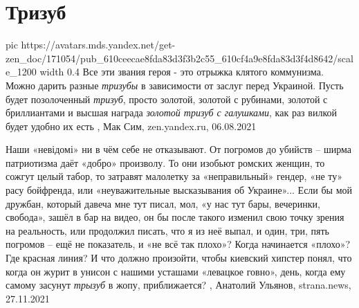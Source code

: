 
 
 
 
 
\chapter{Тризуб}
\label{sec:slova.trizub}

\ifcmt
  pic https://avatars.mds.yandex.net/get-zen_doc/171054/pub_610ceecae8fda83d3f3b2c55_610cf4a9e8fda83d3f4d8642/scale_1200
  width 0.4
\fi
Все эти звания героя - это отрыжка клятого коммунизма. Можно дарить разные
\emph{тризубы} в зависимости от заслуг перед Украиной. Пусть будет позолоченный
\emph{тризуб}, просто золотой, золотой с рубинами, золотой с бриллиантами и высшая
награда \emph{золотой тризуб с галушками}, как раз вилкой будет удобно их есть
, 
Мак Сим, zen.yandex.ru, 06.08.2021

Наши «невідомі» ни в чём себе не отказывают. От погромов до убийств – ширма
патриотизма даёт «добро» произволу. То они изобьют ромских женщин, то сожгут
целый табор, то затравят малолетку за «неправильный» гендер, «не ту» расу
бойфренда, или «неуважительные высказывания об Украине»...  Если бы мой
дружбан, который давеча мне тут писал, мол, «у нас тут бары, вечеринки,
свобода», зашёл в бар на видео, он бы после такого изменил свою точку зрения на
реальность, или продолжил писать, что я из неё выпал, и один, три, пять
погромов – ещё не показатель, и «не всё так плохо»? Когда начинается «плохо»?
Где красная линия? И что должно произойти, чтобы киевский хипстер понял, что
когда он журит в унисон с нашими усташами «левацкое говно», день, когда ему
самому засунут \emph{трызуб} в жопу, приближается?
, 
Анатолий Ульянов, strana.news, 27.11.2021
